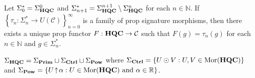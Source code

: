 \begin{lemma}
    \label{Lem:FuncDefFam}
    Let $\Sigma_0^* = \Sigma_{\mathbf{HQC}}^0$ and $\Sigma_{n+1}^* = \Sigma_{\mathbf{HQC}}^{n+1} \setminus \Sigma_{\mathbf{HQC}}^n$ for each $n \in \mathbb{N}$.
    If $\left\{ \tau_n: \Sigma^*_{n} \to U( \mathcal{C} ) \right\}_{n=0}^{\infty}$ is a family of prop signature morphisms, then there exists a unique prop functor $F: \mathbf{HQC} \to \mathcal{C}$ such that $F( g ) = \tau_n( g )$ for each $n \in \mathbb{N}$ and $g \in \Sigma_n^*$.
\end{lemma}

\begin{lemma}
    \label{Lem:FuncDefPart}
    $
        \Sigma_{\mathbf{HQC}}
        =
        \Sigma_{\mathbf{Prim}}
        \sqcup \Sigma_{\mathbf{Ctrl}}
        \sqcup
        \Sigma_{\mathbf{Pow}}
    $
    where
    $
        \Sigma_{\mathbf{Ctrl}}
        =
        \{ U \odot V : U, V \in \operatorname{Mor}( \mathbf{HQC} ) \}
    $
    and
    $
        \Sigma_{\mathbf{Pow}}
        =
        \{
            U \!\uparrow\! \alpha
            :
            U \in \operatorname{Mor}( \mathbf{HQC} )
            \text{ and }
            \alpha \in \mathbb{R}
        \}
    $.
\end{lemma}

